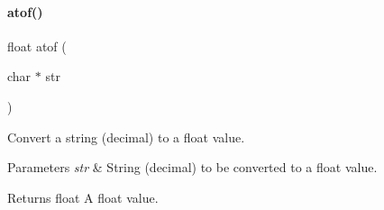 \paragraph{\texorpdfstring{atof()}{atof()}}
{\footnotesize\ttfamily float atof (\begin{DoxyParamCaption}\item[{char $\ast$}]{str }\end{DoxyParamCaption})}



Convert a string (decimal) to a float value. 


\begin{DoxyParams}{Parameters}
{\em str} & String (decimal) to be converted to a float value. \\
\hline
\end{DoxyParams}
\begin{DoxyReturn}{Returns}
float A float value. 
\end{DoxyReturn}
